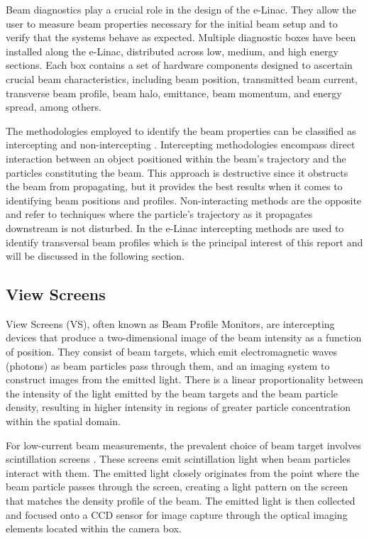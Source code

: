 \documentclass{article}
\begin{document}
Beam diagnostics play a crucial role in the design of the e-Linac. They allow the user to measure beam properties necessary for the initial beam setup and to verify that the systems behave as expected. Multiple diagnostic boxes have been installed along the e-Linac, distributed across low, medium, and high energy sections. Each box contains a set of hardware components designed to ascertain crucial beam characteristics, including beam position, transmitted beam current, transverse beam profile, beam halo, emittance, beam momentum, and energy spread, among others.   

The methodologies employed to identify the beam properties can be classified as intercepting and non-intercepting \cite{storey2011view}. Intercepting methodologies encompass direct interaction between an object positioned within the beam's trajectory and the particles constituting the beam. This approach is destructive since it obstructs the beam from propagating, but it provides the best results when it comes to identifying beam positions and profiles. Non-interacting methods are the opposite and refer to techniques where the particle's trajectory as it propagates downstream is not disturbed. In the e-Linac intercepting methods are used to identify transversal beam profiles which is the principal interest of this report and will be discussed in the following section. 
    
\subsection{View Screens}
    
View Screens (VS), often known as Beam Profile Monitors, are intercepting devices that produce a two-dimensional image of the beam intensity as a function of position. They consist of beam targets, which emit electromagnetic waves (photons) as beam particles pass through them, and an imaging system to construct images from the emitted light. There is a linear proportionality between the intensity of the light emitted by the beam targets and the beam particle density, resulting in higher intensity in regions of greater particle concentration within the spatial domain. 
    
For low-current beam measurements, the prevalent choice of beam target involves scintillation screens \cite{storey2011view}. These screens emit scintillation light when beam particles interact with them. The emitted light closely originates from the point where the beam particle passes through the screen, creating a light pattern on the screen that matches the density profile of the beam. The emitted light is then collected and focused onto a CCD sensor for image capture through the optical imaging elements located within the camera box. 
    
\end{document}
